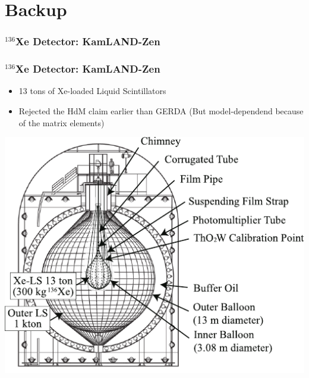 \section*{Backup}
\begin{frame}
	\frametitle{${}^{136}$Xe Detector:  KamLAND-Zen}
		
\end{frame}
\begin{frame}
	\frametitle{${}^{136}$Xe Detector:  KamLAND-Zen}
	\begin{itemize}
		\item 13 tons of Xe-loaded Liquid Scintillators
		\item Rejected the HdM claim earlier than GERDA (But model-dependend because of the matrix elements)	
	\end{itemize}
	\includegraphics[width=.5\textwidth]{media/kamland.pdf}	
\end{frame}
